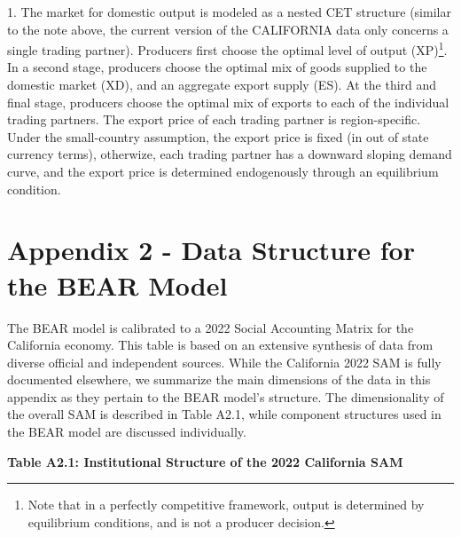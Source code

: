 \documentclass{article}
\begin{document}
\begin{footnotesize}
1. \hspace{10pt} The market for domestic output is modeled as a nested CET structure (similar to the note above, the current version of the CALIFORNIA data only concerns a single trading partner). Producers first choose the optimal level of output (XP)\footnote{Note that in a perfectly competitive framework, output is determined by equilibrium conditions, and is not a producer decision.}. In a second stage, producers choose the optimal mix of goods supplied to the domestic market (XD), and an aggregate export supply (ES). At the third and final stage, producers choose the optimal mix of exports to each of the individual trading partners. The export price of each trading partner is region-specific. Under the small-country assumption, the export price is fixed (in out of state currency terms), otherwize, each trading partner has a downward sloping demand curve, and the export price is determined endogenously through an equilibrium condition.


\end{footnotesize}

\newpage
\section*{Appendix 2 - Data Structure for the BEAR Model}

The BEAR model is calibrated to a 2022 Social Accounting Matrix for the California economy. This table is based on an extensive synthesis of data from diverse official and independent sources. While the California 2022 SAM is fully documented elsewhere, we summarize the main dimensions of the data in this appendix as they pertain to the BEAR model's structure. The dimensionality of the overall SAM is described in Table A2.1, while component structures used in the BEAR model are discussed individually.

\textbf{Table A2.1: Institutional Structure of the 2022 California SAM}
\end{document}
